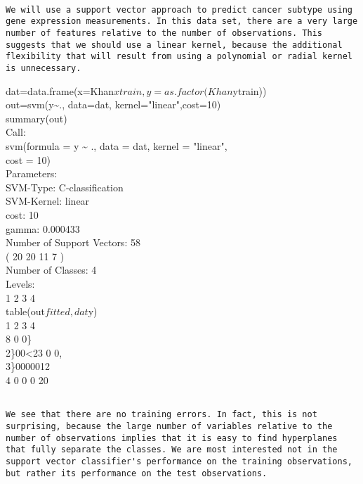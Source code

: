 \documentclass[10pt]{article}
\begin{document}
\begin{verbatim}

We will use a support vector approach to predict cancer subtype using gene expression measurements. In this data set, there are a very large number of features relative to the number of observations. This suggests that we should use a linear kernel, because the additional flexibility that will result from using a polynomial or radial kernel is unnecessary.
\end{verbatim}

\begin{displayquote}
dat=data.frame(x=Khan$xtrain, y=as.factor(Khan$ytrain))\\
out=svm(y\~{}., data=dat, kernel="linear",cost=10)\\
summary(out)\\
Call:\\
svm(formula = y \~{} ., data = dat, kernel = "linear",\\
cost = 10)\\
Parameters:\\
SVM-Type: C-classification\\
SVM-Kernel: linear\\
cost: 10\\
gamma: 0.000433\\
Number of Support Vectors: 58\\
( 20 20 11 7 )\\
Number of Classes: 4\\
Levels:\\
1 2 3 4\\
table(out$fitted, dat$y)\\
1 2 3 4\\
8 0 0\}\\
2\}00<23 0 0,\\
3\}0000012\\
4 0 0 0 20
\end{displayquote}

\begin{verbatim}

We see that there are no training errors. In fact, this is not surprising, because the large number of variables relative to the number of observations implies that it is easy to find hyperplanes that fully separate the classes. We are most interested not in the support vector classifier's performance on the training observations, but rather its performance on the test observations.
\end{verbatim}
\end{document}
